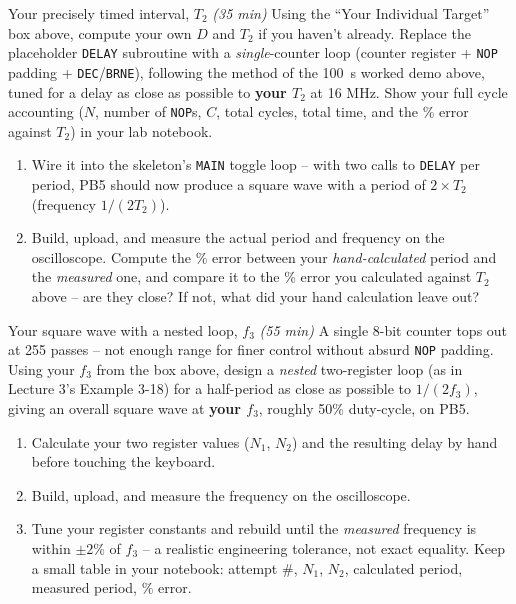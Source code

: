 \documentclass[11pt]{article}
\begin{document}
\begin{labexercise}{Your precisely timed interval, $T_2$ \hfill {\small \itshape (35 min)}}
Using the ``Your Individual Target'' box above, compute your own $D$ and $T_2$ if you
haven't already. Replace the placeholder \texttt{DELAY} subroutine with a
\emph{single}-counter loop (counter register + \texttt{NOP} padding +
\texttt{DEC}/\texttt{BRNE}), following the method of the 100~\textmu s worked demo
above, tuned for a delay as close as possible to \textbf{your $T_2$} at 16 MHz. Show
your full cycle accounting ($N$, number of \texttt{NOP}s, $C$, total cycles, total
time, and the \% error against $T_2$) in your lab notebook.
\begin{enumerate}[nosep,leftmargin=*]
  \item Wire it into the skeleton's \texttt{MAIN} toggle loop -- with two calls to
        \texttt{DELAY} per period, PB5 should now produce a square wave with a
        period of \textbf{$2\times T_2$} (frequency $1/(2T_2)$).
  \item Build, upload, and measure the actual period and frequency on the
        oscilloscope. Compute the \% error between your \emph{hand-calculated} period
        and the \emph{measured} one, and compare it to the \% error you calculated
        against $T_2$ above -- are they close? If not, what did your hand
        calculation leave out?
\end{enumerate}
\end{labexercise}

\begin{labexercise}{Your square wave with a nested loop, $f_3$ \hfill {\small \itshape (55 min)}}
A single 8-bit counter tops out at 255 passes -- not enough range for finer control
without absurd \texttt{NOP} padding. Using your $f_3$ from the box above, design a
\emph{nested} two-register loop (as in Lecture 3's Example 3-18) for a half-period as
close as possible to \textbf{$1/(2f_3)$}, giving an overall square wave at
\textbf{your $f_3$}, roughly 50\% duty-cycle, on PB5.
\begin{enumerate}[nosep,leftmargin=*]
  \item Calculate your two register values ($N_1$, $N_2$) and the resulting delay by
        hand before touching the keyboard.
  \item Build, upload, and measure the frequency on the oscilloscope.
  \item Tune your register constants and rebuild until the \emph{measured} frequency
        is within $\pm 2\%$ of $f_3$ -- a realistic engineering tolerance, not exact
        equality. Keep a small table in your notebook: attempt \#, $N_1$, $N_2$,
        calculated period, measured period, \% error.
\end{enumerate}
\end{labexercise}
\end{document}
